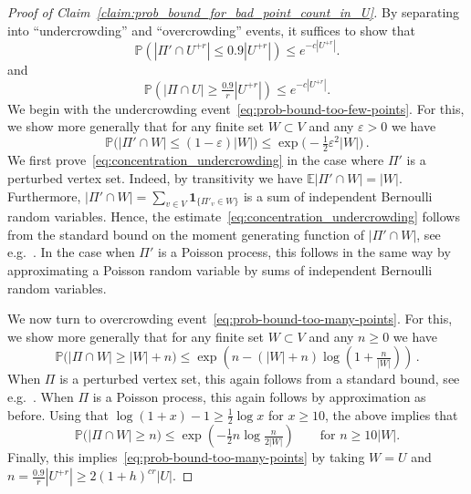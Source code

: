 \documentclass[11pt, reqno]{article}
\numberwithin{equation}{section}
\theoremstyle{definition}
\def\P{\mathbb{P}}
\def\E{\mathbb{E}}
\newcommand{\1}{\mathds{1}}
\def\eps{\varepsilon}
\begin{document}
\begin{proof}[Proof of Claim~\ref{claim:prob_bound_for_bad_point_count_in_U}]
    
    By separating into ``undercrowding'' and ``overcrowding'' events, it suffices to show that
    \begin{equation}\label{eq:prob-bound-too-few-points}
    \P(|\Pi'\cap U^{+r}| \le 0.9 |U^{+r}|) \le e^{-c|U^{+r}|} .
    \end{equation}
    and
    \begin{equation}\label{eq:prob-bound-too-many-points}
    \P(|\Pi \cap U| \ge \tfrac{0.9}{r} |U^{+r}|) \le e^{-c|U^{+r}|} .
    \end{equation}
    We begin with the undercrowding event~\eqref{eq:prob-bound-too-few-points}.
    For this, we show more generally that for any finite set $W\subset V$ and any $\eps>0$ we have
    \begin{equation}
        \label{eq:concentration_undercrowding}
        \P\Big(|\Pi'\cap W| \le (1-\eps) |W|\Big) \le \exp \big(-\tfrac12 \eps^2 |W|\big) \, .
    \end{equation}
    We first prove~\eqref{eq:concentration_undercrowding} in the case where $\Pi'$ is a perturbed vertex set. Indeed, by transitivity we have $\E|\Pi'\cap W| = |W|$. Furthermore, $|\Pi'\cap W| = \sum_{v\in V} \mathbf{1}_{\{\Pi'_v \in W\}}$ is a sum of independent Bernoulli random variables. Hence, the estimate~\eqref{eq:concentration_undercrowding} follows from the standard bound on the moment generating function of $|\Pi'\cap W|$, see e.g.~\cite[Theorem~A.1.13]{alon2016probabilistic}. In the case when $\Pi'$ is a Poisson process, this follows in the same way by approximating a Poisson random variable by sums of independent Bernoulli random variables.

    We now turn to overcrowding event~\eqref{eq:prob-bound-too-many-points}.
    For this, we show more generally that for any finite set $W\subset V$ and any $n \ge 0$ we have
    \begin{equation*}
        \P\Big(|\Pi\cap W| \ge |W| + n\Big) \le \exp\left(n-(|W|+n) \log(1+\tfrac{n}{|W|})\right) \, .
    \end{equation*}
    When $\Pi$ is a perturbed vertex set, this again follows from a standard bound, see e.g.~\cite[Corollary~A.1.10]{alon2016probabilistic}. When $\Pi$ is a Poisson process, this again follows by approximation as before.
    Using that $\log(1+x)-1 \ge \frac12 \log x$ for $x \ge 10$, the above implies that
    \begin{equation}
        \label{eq:concentration_overcrowding}
        \P\Big(|\Pi\cap W| \ge n\Big) \le \exp\left(-\tfrac12 n\log \tfrac{n}{2|W|}\right) \qquad\text{for }n \ge 10|W| .
    \end{equation}
    Finally, this implies~\eqref{eq:prob-bound-too-many-points} by taking $W=U$ and $n=\frac{0.9}{r}|U^{+r}| \ge 2(1+h)^{cr} |U|$. 
\end{proof}
\end{document}
